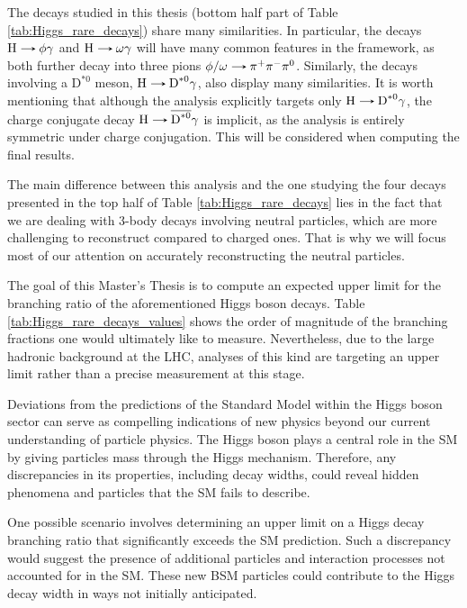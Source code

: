The decays studied in this thesis (bottom half part of Table \ref{tab:Higgs_rare_decays}) share many similarities. In particular, the decays $\text{H}\decaysto \phi\gamma$ and $\text{H}\decaysto \omega\gamma$ will have many common features in the framework, as both further decay into three pions $\phi/\omega\decaysto \pi^+\pi^-\pi^0$. Similarly, the decays involving a $\text{D}^{*0}$ meson, $\text{H}\decaysto \text{D}^{*0}\gamma$, also display many similarities. It is worth mentioning that although the analysis explicitly targets only $\text{H}\decaysto \text{D}^{*0}\gamma$, the charge conjugate decay $\text{H}\decaysto \overline{\text{D}^{*0}}\gamma$ is implicit, as the analysis is entirely symmetric under charge conjugation. This will be considered when computing the final results.

The main difference between this analysis and the one studying the four decays presented in the top half of Table \ref{tab:Higgs_rare_decays} lies in the fact that we are dealing with 3-body decays involving neutral particles, which are more challenging to reconstruct compared to charged ones. That is why we will focus most of our attention on accurately reconstructing the neutral particles.

The goal of this Master's Thesis is to compute an expected upper limit for the branching ratio of the aforementioned Higgs boson decays. Table \ref{tab:Higgs_rare_decays_values} shows the order of magnitude of the branching fractions one would ultimately like to measure. Nevertheless, due to the large hadronic background at the LHC, analyses of this kind are targeting an upper limit rather than a precise measurement at this stage.

Deviations from the predictions of the Standard Model within the Higgs boson sector can serve as compelling indications of new physics beyond our current understanding of particle physics. The Higgs boson plays a central role in the SM by giving particles mass through the Higgs mechanism. Therefore, any discrepancies in its properties, including decay widths, could reveal hidden phenomena and particles that the SM fails to describe.

One possible scenario involves determining an upper limit on a Higgs decay branching ratio that significantly exceeds the SM prediction. Such a discrepancy would suggest the presence of additional particles and interaction processes not accounted for in the SM. These new BSM particles could contribute to the Higgs decay width in ways not initially anticipated.

